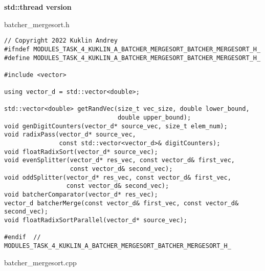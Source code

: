 \documentclass{report}
\begin{document}
\textbf{std::thread version}
\par batcher\_mergesort.h
\begin{lstlisting}
// Copyright 2022 Kuklin Andrey
#ifndef MODULES_TASK_4_KUKLIN_A_BATCHER_MERGESORT_BATCHER_MERGESORT_H_
#define MODULES_TASK_4_KUKLIN_A_BATCHER_MERGESORT_BATCHER_MERGESORT_H_

#include <vector>

using vector_d = std::vector<double>;

std::vector<double> getRandVec(size_t vec_size, double lower_bound,
                               double upper_bound);
void genDigitCounters(vector_d* source_vec, size_t elem_num);
void radixPass(vector_d* source_vec,
               const std::vector<vector_d>& digitCounters);
void floatRadixSort(vector_d* source_vec);
void evenSplitter(vector_d* res_vec, const vector_d& first_vec,
                  const vector_d& second_vec);
void oddSplitter(vector_d* res_vec, const vector_d& first_vec,
                 const vector_d& second_vec);
void batcherComparator(vector_d* res_vec);
vector_d batcherMerge(const vector_d& first_vec, const vector_d& second_vec);
void floatRadixSortParallel(vector_d* source_vec);

#endif  // MODULES_TASK_4_KUKLIN_A_BATCHER_MERGESORT_BATCHER_MERGESORT_H_
\end{lstlisting}
\par batcher\_mergesort.cpp
\end{document}
